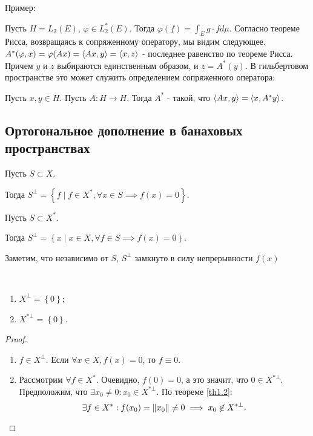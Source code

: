 Пример: \todo

Пусть $H = L_2(E)$, $\varphi \in L_2^*(E)$.
Тогда $\varphi(f) = \int_{E} g \cdot f d\mu$.
Согласно теореме Рисса, возвращаясь к сопряженному оператору, мы видим следующее.
$A^*(\varphi, x) = \varphi(Ax) = \left\langle Ax , y\right\rangle = \left\langle x , z\right\rangle$ - последнее равенство по теореме Рисса.
Причем $y$ и $z$ выбираются единственным образом, и $z = A^*(y)$.
В гильбертовом пространстве это может служить определением сопряженного оператора:
\begin{definition}
    Пусть $x, y \in H$. Пусть $A: H \rightarrow H$. Тогда $A^*$ - такой, что $\left\langle Ax , y\right\rangle = \left\langle x , A^*y\right\rangle$.
\end{definition}

\subsection{Ортогональное дополнение в банаховых пространствах}


\begin{definition}
    Пусть $S \subset X$.

    Тогда $S^\bot = \left\{ f \mid f \in X^*, \forall x \in S \implies f(x) = 0 \right\}$.
\end{definition}

\begin{definition}
    Пусть $S \subset X^*$.

     Тогда $S^\bot = \left\{ x \mid x \in X, \forall f \in S \implies f(x) = 0 \right\}$.
\end{definition}
Заметим, что независимо от $S$, $S^\bot$ замкнуто в силу непрерывности $f(x)$

\begin{statement} \ 
    \begin{enumerate}
        \item $X^\bot = \left\{ 0\right\}$;
        \item $X^{*\bot} = \left\{ 0\right\}$.
    \end{enumerate}
\end{statement}
\begin{proof}\ 
    \begin{enumerate}
        \item $f \in X^\bot$. Если $\forall x \in X, f(x) = 0 $, то $f \equiv 0$.
        \item Рассмотрим $\forall f \in X^*$. Очевидно, $f(0) = 0$, а это значит, что $0 \in X^{*\bot}$.
            Предположим, что $\exists x_0 \neq 0 : x_0 \in X^{*\bot}$.
            По теореме \ref{th1.2}:
            \[
                \exists f \in X^* : f(x_0) = \left\|x_0\right\| \neq 0 \implies x_0 \not\in X^{*\bot}\text{.} \qedhere
            \]
    \end{enumerate}
\end{proof}

